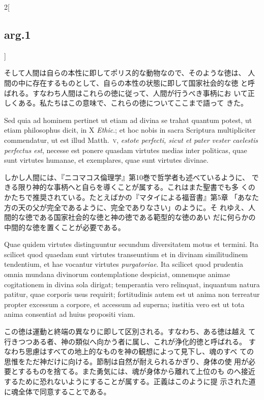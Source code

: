 \documentclass[paper=a4paper,fontsize=10pt,jafontsize=9pt,titlepage]{jlreq}
\begin{document}
\begin{paracol}{2}[\subsection{arg.1}]
\switchcolumn

そして人間は自らの本性に即してポリス的な動物なので、そのような徳は、
 人間の中に存在するものとして、自らの本性の状態に即して国家社会的な徳
 と呼ばれる。すなわち人間はこれらの徳に従って、人間が行うべき事柄にお
 いて正しくある。私たちはこの意味で、これらの徳についてここまで語って
 きた。

\switchcolumn*

Sed quia ad hominem pertinet ut etiam ad divina se trahat quantum
 potest, ut etiam philosophus dicit, in X {\itshape Ethic}.; et hoc
 nobis in sacra Scriptura multipliciter commendatur, ut est illud
 Matth.~{\scshape v}, {\itshape estote perfecti, sicut et pater vester
 caelestis perfectus est}, necesse est ponere quasdam virtutes medias
 inter politicas, quae sunt virtutes humanae, et exemplares, quae sunt
 virtutes divinae.

\switchcolumn

しかし人間には、『ニコマコス倫理学』第10巻で哲学者も述べているように、
 できる限り神的な事柄へと自らを導くことが属する。これはまた聖書でも多
 くのかたちで推奨されている。たとえばかの『マタイによる福音書』第5章
 「あなた方の天の父が完全であるように、完全でありなさい」のように。そ
 れゆえ、人間的な徳である国家社会的な徳と神の徳である範型的な徳のあい
 だに何らかの中間的な徳を置くことが必要である。

\switchcolumn*

Quae quidem virtutes distinguuntur secundum diversitatem motus et
 termini. Ita scilicet quod quaedam sunt virtutes transeuntium et in
 divinam similitudinem tendentium, et hae vocantur virtutes {\itshape
 purgatoriae}. Ita scilicet quod prudentia omnia mundana divinorum
 contemplatione despiciat, omnemque animae cogitationem in divina sola
 dirigat; temperantia vero relinquat, inquantum natura patitur, quae
 corporis usus requirit; fortitudinis autem est ut anima non terreatur
 propter excessum a corpore, et accessum ad superna; iustitia vero est
 ut tota anima consentiat ad huius propositi viam.

\switchcolumn

この徳は運動と終端の異なりに即して区別される。すなわち、ある徳は越え
 て行きつつある者、神の類似へ向かう者に属し、これが浄化的徳と呼ばれる。
 すなわち思慮はすべての地上的なものを神の観想によって見下し、魂のすべ
 ての思惟をただ神だけに向ける。節制は自然が耐えられるかぎり、身体の使
 用が必要とするものを捨てる。また勇気には、魂が身体から離れて上位のも
 のへ接近するために恐れないようにすることが属する。正義はこのように提
 示された道に魂全体で同意することである。


\end{paracol}
\end{document}
